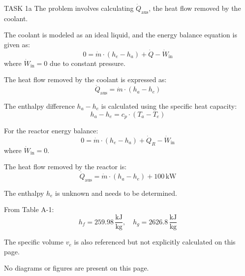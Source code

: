TASK 1a  
The problem involves calculating \( \dot{Q}_{\text{aus}} \), the heat flow removed by the coolant.  

The coolant is modeled as an ideal liquid, and the energy balance equation is given as:  
\[
0 = \dot{m} \cdot (h_e - h_a) + \dot{Q} - \dot{W}_{\text{in}}
\]  
where \( \dot{W}_{\text{in}} = 0 \) due to constant pressure.  

The heat flow removed by the coolant is expressed as:  
\[
\dot{Q}_{\text{aus}} = \dot{m} \cdot (h_a - h_e)
\]  

The enthalpy difference \( h_a - h_e \) is calculated using the specific heat capacity:  
\[
h_a - h_e = c_p \cdot (T_a - T_e)
\]  

For the reactor energy balance:  
\[
0 = \dot{m} \cdot (h_e - h_a) + \dot{Q}_R - \dot{W}_{\text{in}}
\]  
where \( \dot{W}_{\text{in}} = 0 \).  

The heat flow removed by the reactor is:  
\[
\dot{Q}_{\text{aus}} = \dot{m} \cdot (h_a - h_e) + 100 \, \text{kW}
\]  

The enthalpy \( h_e \) is unknown and needs to be determined.  

From Table A-1:  
\[
h_f = 259.98 \, \frac{\text{kJ}}{\text{kg}}, \quad h_g = 2626.8 \, \frac{\text{kJ}}{\text{kg}}
\]  

The specific volume \( v_e \) is also referenced but not explicitly calculated on this page.  

No diagrams or figures are present on this page.